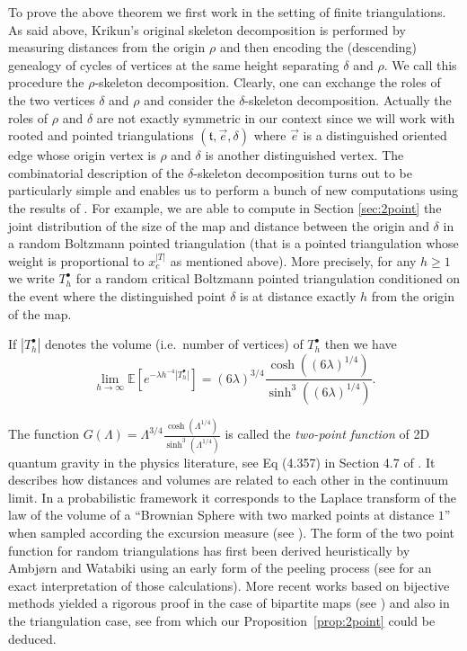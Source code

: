 \documentclass[AHL,XML,longabstracts,Unicode,NoSaveZebib]{cedram}
\begin{document}
To prove the above theorem we first work in the setting of finite triangulations. As said above, Krikun's original skeleton decomposition is performed by measuring distances from the origin $\rho$ and then encoding the (descending) genealogy of cycles of vertices at the same height separating $\delta$ and $\rho$. We call this procedure the $\rho$-skeleton decomposition. Clearly, one can exchange the roles of the two vertices $\delta$ and $\rho$ and consider the $\delta$-skeleton decomposition. Actually the roles of $\rho$ and $\delta$ are not exactly symmetric in our context since we will work with rooted and pointed triangulations $( \mathfrak{t}, \vec{e}, \delta)$ where $\vec{e}$ is a distinguished oriented edge whose origin vertex is $\rho$ and $\delta$ is another distinguished vertex. The combinatorial description of the $\delta$-skeleton decomposition turns out to be particularly simple and enables us to perform a bunch of new computations using the results of \cite{M}.
For example, we are able to compute in Section \ref{sec:2point} the joint distribution of the size of the map and distance between the origin and $\delta$  in a random Boltzmann pointed triangulation (that is a pointed triangulation whose weight is proportional to $x_c^{|T|}$ as mentioned above). More precisely, for any $h \geq 1$ we write $T_{h}^{\bullet}$ for a random critical Boltzmann pointed triangulation conditioned on the event where the distinguished point $\delta$ is at distance exactly $h$ from the origin of the map.
\begin{proposition}
\label{prop:2point}
If $|T^{\bullet}_{h}|$ denotes the volume (i.e.~number of vertices) of $T^{\bullet}_{h}$ then we have
$$ \lim_{h\to \infty} \mathbb{E}\left[ e^{-\lambda h^{-4} |T^{\bullet}_{h}|} \right] =(6\lambda) ^{3/4} \frac{\cosh((6\lambda)^{1/4})}{\sinh^{3}( (6\lambda) ^{1/4})}.$$
\end{proposition}
The function $G(\Lambda) = \Lambda ^{3/4} \frac{\cosh(\Lambda^{1/4})}{\sinh^{3}( \Lambda ^{1/4})}$ is called the \emph{two-point function} of 2D quantum gravity in the physics literature, see Eq (4.357) in Section 4.7 of \cite{ADJ}. It describes how distances and volumes are related to each other in the continuum limit. In a probabilistic framework it corresponds to the Laplace transform of the law of the volume of a ``Brownian Sphere with two marked points at distance $1$'' when sampled according the excursion measure (see  \cite[Proposition 4.6]{CLG16}).  The form of the two point function for random triangulations has first been derived heuristically by Ambj\o rn and Watabiki using an early form of the peeling process \cite{AW} (see \cite{AB14} for an exact interpretation of those calculations). More recent works based on bijective methods yielded a rigorous proof in the case of bipartite maps (see \cite{BDFG03,BG12,DF05}) and also in the triangulation case, see \cite[Section 6.1]{BG12} from which our Proposition~\ref{prop:2point}
 could be deduced.
\end{document}
